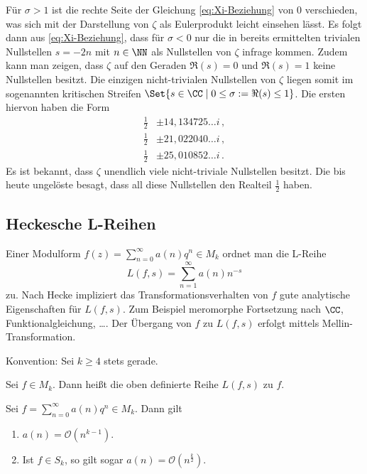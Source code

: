 Für $\sigma > 1$ ist die rechte Seite der Gleichung \eqref{eq:Xi-Beziehung} von $0$ verschieden, was sich mit der Darstellung von $\zeta$ als Eulerprodukt leicht einsehen lässt. Es folgt dann aus \eqref{eq:Xi-Beziehung}, dass für $\sigma < 0$ nur die in  bereits ermittelten \glqq{}trivialen Nullstellen\grqq{} $s = -2n$ mit $n \in \NN$ als Nullstellen von $\zeta$ infrage kommen. Zudem kann man zeigen, dass $\zeta$ auf den Geraden $\Re(s) = 0$ und $\Re(s) = 1$ keine Nullstellen besitzt. Die einzigen \glqq{}nicht-trivialen\grqq{} Nullstellen von $\zeta$ liegen somit im sogenannten \glqq{}kritischen Streifen\grqq{} $\Set {s \in \CC \mid 0 \leq \sigma := \Re(s) \leq 1}$. Die \glqq{}ersten\grqq{} hiervon haben die Form
\begin{align*}
	\tfrac 12 &\pm 14,134725\ldots i \,, \\
	\tfrac 12 &\pm 21,022040\ldots i \,, \\
	\tfrac 12 &\pm 25,010852\ldots i \,.
\end{align*}
Es ist bekannt, dass $\zeta$ unendlich viele nicht-triviale Nullstellen besitzt. Die bis heute ungelöste  besagt, dass all diese Nullstellen den Realteil $\frac 12$ haben.

\subsection{Heckesche L-Reihen}

Einer Modulform $f(z) = \sum_{n=0}^\infty a(n) q^n \in M_k$ ordnet man die L-Reihe
\[
	L(f,s) = \sum_{n=1}^\infty a(n)n^{-s}
\]
zu. Nach Hecke impliziert das Transformationsverhalten von $f$ \glqq{}gute\grqq{} analytische Eigenschaften für $L(f,s)$. Zum Beispiel meromorphe Fortsetzung nach $\CC$, Funktionalgleichung, \ldots. Der Übergang von $f$ zu $L(f,s)$ erfolgt mittels Mellin-Transformation.

Konvention: Sei $k \geq 4$ stets gerade. 

\begin{defi}
Sei $f \in M_k$. Dann heißt die oben definierte Reihe $L(f,s)$  zu $f$. 
\end{defi}

\begin{satz}
Sei $f = \sum_{n=0}^\infty a(n) q^n \in M_k$. Dann gilt
\begin{enumerate}
\item $a(n) = \mathcal O(n^{k-1})$.
\item Ist $f \in S_k$, so gilt sogar $a(n) = \mathcal O(n^{\frac k2})$.
\end{enumerate}
\end{satz}

